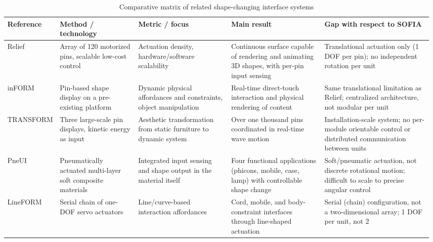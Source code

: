 \documentclass[lettersize,journal]{IEEEtran}
\begin{document}
		\begin{table}[!t]
		\centering
		\caption{Comparative matrix of related shape-changing interface systems}
		\label{tab:related_work_matrix}
		\scriptsize
		
		\setlength{\tabcolsep}{3pt}
		\renewcommand{\arraystretch}{1.1}
		
		\begin{tabularx}{\textwidth}
			{@{}P{2.2cm} P{3cm} P{3cm} P{4cm} Y@{}}
			
			\toprule
			Reference & Method / technology & Metric / focus & Main result & Gap with respect to SOFIA \\
			\midrule
			
			Relief \cite{leithinger2010relief} &
			Array of 120 motorized pins, scalable low-cost control &
			Actuation density, hardware/software scalability &
			Continuous surface capable of rendering and animating 3D shapes, with per-pin input sensing &
			Translational actuation only (1 DOF per pin); no independent rotation per unit \\
			
			inFORM \cite{follmer2013inform} &
			Pin-based shape display on a pre-existing platform &
			Dynamic physical affordances and constraints, object manipulation &
			Real-time direct-touch interaction and physical rendering of content &
			Same translational limitation as Relief; centralized architecture, not modular per unit \\
			
			TRANSFORM \cite{ishii2015transform} &
			Three large-scale pin displays, kinetic energy as input &
			Aesthetic transformation from static furniture to dynamic system &
			Over one thousand pins coordinated in real-time wave motion &
			Installation-scale system; no per-module orientable control or distributed communication between units \\
			
			PneUI \cite{yao2013pneui} &
			Pneumatically actuated multi-layer soft composite materials &
			Integrated input sensing and shape output in the material itself &
			Four functional applications (phicons, mobile, case, lamp) with controllable shape change &
			Soft/pneumatic actuation, not discrete rotational motion; difficult to scale to precise angular control \\
			
			LineFORM \cite{nakagaki2015lineform} &
			Serial chain of one-DOF servo actuators &
			Line/curve-based interaction affordances &
			Cord, mobile, and body-constraint interfaces through line-shaped actuation &
			Serial (chain) configuration, not a two-dimensional array; 1 DOF per unit, not 2 \\
			

\end{tabularx}
\end{table}
\end{document}

